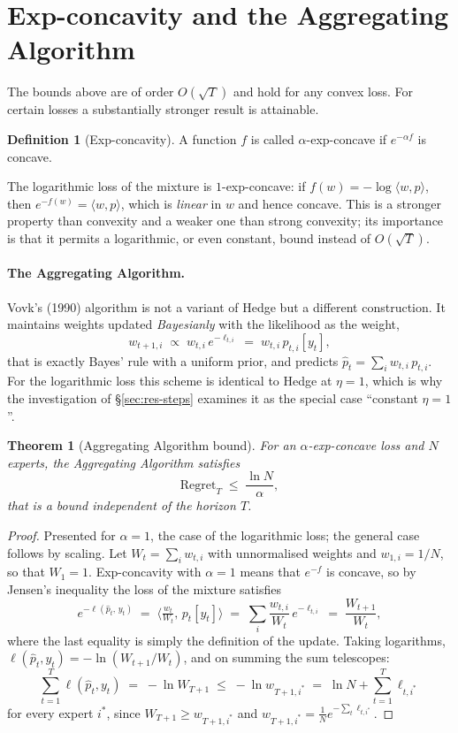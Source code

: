 \documentclass[12pt,a4paper,oneside]{report}
\renewcommand{\_}{\oldunderscore\allowbreak}
\theoremstyle{definition}
\newtheorem{definition}{Definition}[chapter]
\theoremstyle{plain}
\newtheorem{theorem}{Theorem}[chapter]
\theoremstyle{remark}
\begin{document}
\section{Exp-concavity and the Aggregating Algorithm}
\label{sec:expconcave}

The bounds above are of order $O(\sqrt{T})$ and hold for any convex loss. For certain losses a
substantially stronger result is attainable.

\begin{definition}[Exp-concavity]
A function $f$ is called $\alpha$-exp-concave if $e^{-\alpha f}$ is concave.
\end{definition}

The logarithmic loss of the mixture is $1$-exp-concave: if $f(w) = -\log \langle w, p\rangle$,
then $e^{-f(w)} = \langle w, p\rangle$, which is \emph{linear} in $w$ and hence concave. This
is a stronger property than convexity and a weaker one than strong convexity; its importance is
that it permits a logarithmic, or even constant, bound instead of $O(\sqrt{T})$.

\paragraph{The Aggregating Algorithm.} Vovk's (1990) algorithm is not a variant of Hedge but a
different construction. It maintains weights updated \emph{Bayesianly} with the likelihood as
the weight,
\[
w_{t+1,i} \;\propto\; w_{t,i}\, e^{-\ell_{t,i}} \;=\; w_{t,i}\, p_{t,i}[y_t],
\]
that is exactly Bayes' rule with a uniform prior, and predicts
$\hat{p}_t = \sum_i w_{t,i}\,p_{t,i}$. For the logarithmic loss this scheme is identical to
Hedge at $\eta=1$, which is why the investigation of \S\ref{sec:res-steps} examines it as the
special case ``constant $\eta=1$''.

\begin{theorem}[Aggregating Algorithm bound]
\label{thm:aa}
For an $\alpha$-exp-concave loss and $N$ experts, the Aggregating Algorithm satisfies
\[
\mathrm{Regret}_T \;\leq\; \frac{\ln N}{\alpha},
\]
that is a bound \emph{independent of the horizon} $T$.
\end{theorem}

\begin{proof}
Presented for $\alpha=1$, the case of the logarithmic loss; the general case follows by
scaling. Let $W_t = \sum_i w_{t,i}$ with unnormalised weights and $w_{1,i}=1/N$, so that
$W_1=1$. Exp-concavity with $\alpha=1$ means that $e^{-f}$ is concave, so by Jensen's
inequality the loss of the mixture satisfies
\[
e^{-\ell(\hat{p}_t,\,y_t)} \;=\; \Big\langle \tfrac{w_t}{W_t},\, p_t[y_t]\Big\rangle
\;=\; \sum_i \frac{w_{t,i}}{W_t}\, e^{-\ell_{t,i}} \;=\; \frac{W_{t+1}}{W_t},
\]
where the last equality is simply the definition of the update. Taking logarithms,
$\ell(\hat{p}_t,y_t) = -\ln(W_{t+1}/W_t)$, and on summing the sum telescopes:
\[
\sum_{t=1}^{T} \ell(\hat{p}_t, y_t) \;=\; -\ln W_{T+1} \;\leq\; -\ln w_{T+1,i^{*}}
\;=\; \ln N + \sum_{t=1}^{T} \ell_{t,i^{*}}
\]
for every expert $i^{*}$, since $W_{T+1} \geq w_{T+1,i^{*}}$ and
$w_{T+1,i^{*}} = \frac{1}{N}e^{-\sum_t \ell_{t,i^{*}}}$.
\end{proof}
\end{document}
